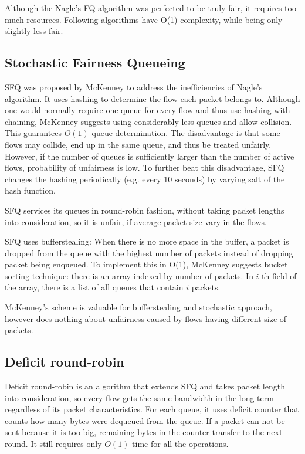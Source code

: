 Although the Nagle's FQ algorithm was perfected to be truly fair, it requires too much resources. Following algorithms have O(1) complexity, while being only slightly less fair.


\subsection{Stochastic Fairness Queueing}

SFQ was proposed by McKenney \cite{SFQ} to address the inefficiencies of Nagle’s algorithm. It uses hashing to determine the flow each packet belongs to. Although one would normally require one queue for every flow and thus use hashing with chaining, McKenney suggests using considerably less queues and allow collision. This guarantees $O(1)$ queue determination. The disadvantage is that some flows may collide, end up in the same queue, and thus be treated unfairly. However, if the number of queues is sufficiently larger than the number of active flows, probability of unfairness is low. To further beat this disadvantage, SFQ changes the hashing periodically (e.g. every 10 seconds) by varying salt of the hash function.

SFQ services its queues in round-robin fashion, without taking packet lengths into consideration, so it is unfair, if average packet size vary in the flows.

SFQ uses bufferstealing: When there is no more space in the buffer, a packet is dropped from the queue with the highest number of packets instead of dropping packet being enqueued. To implement this in O(1), McKenney suggests bucket sorting technique: there is an array indexed by number of packets. In $i$-th field of the array, there is a list of all queues that contain $i$ packets.

McKenney's scheme is valuable for bufferstealing and stochastic approach, however does nothing about unfairness caused by flows having different size of packets.

\subsection{Deficit round-robin}
\label{DRR}
Deficit round-robin \cite{EffDRR} is an algorithm that extends SFQ and takes packet length into consideration, so every flow gets the same bandwidth in the long term regardless of its packet characteristics. For each queue, it uses deficit counter that counts how many bytes were dequeued from the queue. If a packet can not be sent because it is too big, remaining bytes in the counter transfer to the next round. It still requires only $O(1)$ time for all the operations.

